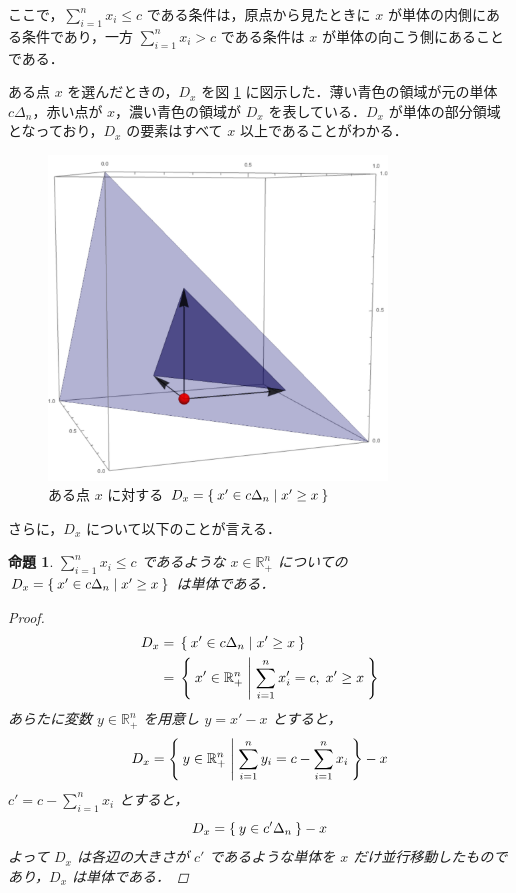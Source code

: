 \documentclass[a4paper,11pt]{jreport}
\newtheorem{proposition}{命題}
\begin{document}
ここで，$ \sum_{i=1}^{n}x_i \leq c $ である条件は，原点から見たときに $ x $ が単体の内側にある条件であり，一方 $ \sum_{i=1}^{n}x_i > c $ である条件は $ x $ が単体の向こう側にあることである．\par
ある点 $ x $ を選んだときの，$ D_x $ を図 \ref{fig:a_on_simplex} に図示した．薄い青色の領域が元の単体 $ c \Delta_n $，赤い点が $ x $，濃い青色の領域が $ D_x $ を表している．$ D_x $ が単体の部分領域となっており，$ D_x $ の要素はすべて $ x $ 以上であることがわかる．\par

\begin{figure}
\begin{center}
\includegraphics[width=9cm]{graphs/a_on_simplex.pdf}
\caption{ある点 $ x $ に対する $ D_x = \Set{x' \in c \Delta_n | x' \geq x} $}
\label{fig:a_on_simplex}
\end{center}
\end{figure}

さらに，$ D_x $ について以下のことが言える．

\begin{proposition} \label{prop:a_x_is_simplex}
$ \sum_{i = 1}^{n} x_i \leq c $ であるような $ x \in \mathbb{R}_+^n $ についての $ D_x = \Set{x' \in c \Delta_n | x' \geq x} $ は単体である．

\begin{proof}
\begin{align*}
D_x = & \; \Set{x' \in c \Delta_n | x' \geq x} \\
= & \; \Set{x' \in \mathbb{R}_+^n | \sum_{i = 1}^{n} x'_i = c, \; x' \geq x}
\end{align*}
あらたに変数 $ y \in \mathbb{R}_+^n $ を用意し $ y = x' - x $ とすると，
$$ D_x = \Set{y \in \mathbb{R}_+^n | \sum_{i = 1}^{n} y_i = c - \sum_{i = 1}^{n} x_i} - x $$
$ c' = c - \sum_{i = 1}^{n} x_i $ とすると，
$$ D_x = \Set{y \in c' \Delta_n} - x $$
よって $ D_x $ は各辺の大きさが $ c' $ であるような単体を $ x $ だけ並行移動したものであり，$ D_x $ は単体である．
\end{proof}

\end{proposition}
\end{document}
